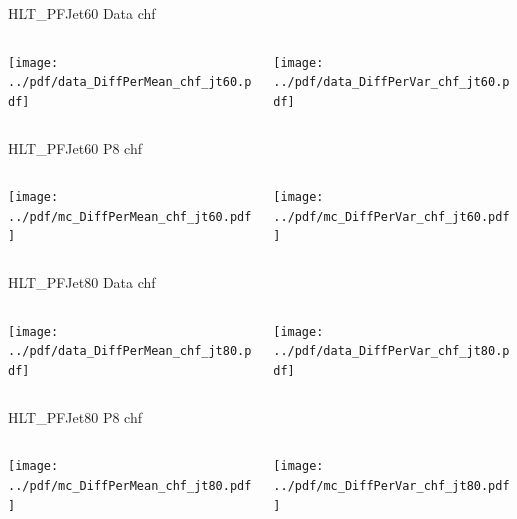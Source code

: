 \documentclass[9pt]{beamer}
\begin{document}
\begin{frame}[t]{HLT\_PFJet60 Data chf}
\begin{columns}[T]
  \begin{column}{.5\textwidth}
  \texttt{[image: ../pdf/data\_DiffPerMean\_chf\_jt60.pdf]}
  \end{column}
  \begin{column}{.5\textwidth}
  \texttt{[image: ../pdf/data\_DiffPerVar\_chf\_jt60.pdf]}
  \end{column}
\end{columns}
\end{frame}

\begin{frame}[t]{HLT\_PFJet60 P8 chf}
\begin{columns}[T]
  \begin{column}{.5\textwidth}
  \texttt{[image: ../pdf/mc\_DiffPerMean\_chf\_jt60.pdf]}
  \end{column}
  \begin{column}{.5\textwidth}
  \texttt{[image: ../pdf/mc\_DiffPerVar\_chf\_jt60.pdf]}
  \end{column}
\end{columns}
\end{frame}

\begin{frame}[t]{HLT\_PFJet80 Data chf}
\begin{columns}[T]
  \begin{column}{.5\textwidth}
  \texttt{[image: ../pdf/data\_DiffPerMean\_chf\_jt80.pdf]}
  \end{column}
  \begin{column}{.5\textwidth}
  \texttt{[image: ../pdf/data\_DiffPerVar\_chf\_jt80.pdf]}
  \end{column}
\end{columns}
\end{frame}

\begin{frame}[t]{HLT\_PFJet80 P8 chf}
\begin{columns}[T]
  \begin{column}{.5\textwidth}
  \texttt{[image: ../pdf/mc\_DiffPerMean\_chf\_jt80.pdf]}
  \end{column}
  \begin{column}{.5\textwidth}
  \texttt{[image: ../pdf/mc\_DiffPerVar\_chf\_jt80.pdf]}
  \end{column}
\end{columns}
\end{frame}
\end{document}
